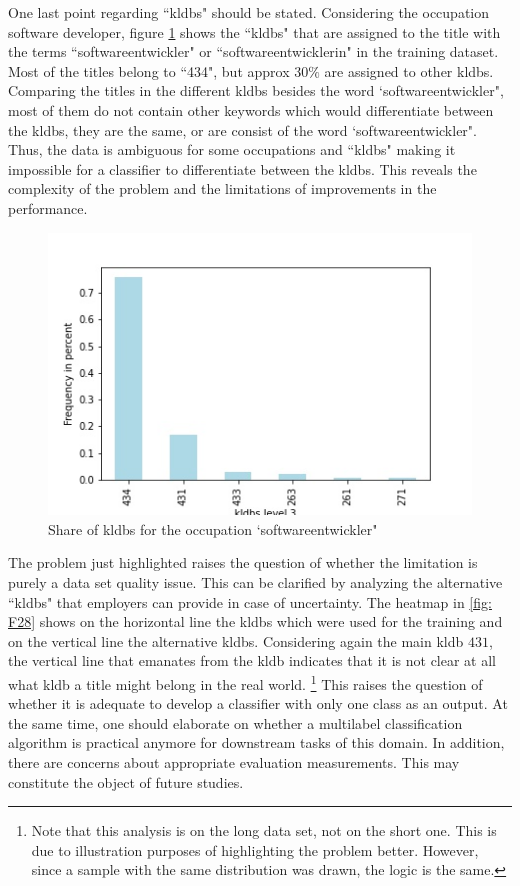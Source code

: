 \documentclass[12pt, a4paper, titlepage]{article}
\begin{document}
One last point regarding ``kldbs" should be stated. Considering the occupation software developer, figure \ref{fig: F27} shows the ``kldbs" that are assigned to the title with the terms ``softwareentwickler" or ``softwareentwicklerin" in the training dataset. Most of the titles belong to ``434", but approx $30\%$ are assigned to other kldbs. Comparing the titles in the different kldbs besides the word `softwareentwickler", most of them do not contain other keywords which would differentiate between the kldbs, they are the same, or are consist of the word `softwareentwickler". Thus, the data is ambiguous for some occupations and ``kldbs" making it impossible for a classifier to differentiate between the kldbs. This reveals the complexity of the problem and the limitations of improvements in the performance. 

\begin{figure}[hb!]
  \center
  \includegraphics[scale=0.5]{kldbs_frequency_softwareentwickler.jpg}
  \caption{\label{fig: F27} Share of kldbs for the occupation `softwareentwickler"}
\end{figure}

The problem just highlighted raises the question of whether the limitation is purely a data set quality issue. This can be clarified by analyzing the alternative ``kldbs" that employers can provide in case of uncertainty. The heatmap in \ref{fig: F28} shows on the horizontal line the kldbs which were used for the training and on the vertical line the alternative kldbs. Considering again the main kldb $431$, the vertical line that emanates from the kldb indicates that it is not clear at all what kldb a title might belong in the real world. \footnote{Note that this analysis is on the long data set, not on the short one. This is due to illustration purposes of highlighting the problem better. However, since a sample with the same distribution was drawn, the logic is the same.} This raises the question of whether it is adequate to develop a classifier with only one class as an output. At the same time, one should elaborate on whether a multilabel classification algorithm is practical anymore for downstream tasks of this domain. In addition, there are concerns about appropriate evaluation measurements. This may constitute the object of future studies.
\end{document}
